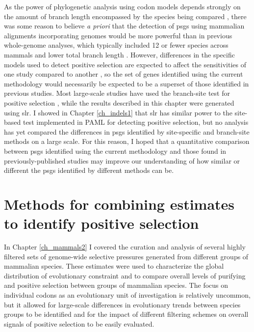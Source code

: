 As the power of phylogenetic analysis using codon models depends
strongly on the amount of branch length encompassed by the species
being compared \citep{Anisimova2001,Anisimova2002}, there was some
reason to believe \emph{a priori} that the detection of \acp{psg}
using mammalian alignments incorporating \lcv genomes would be more
powerful than in previous whole-genome analyses, which typically
included 12 or fewer species across mammals and lower total branch
length \citep{ELLEGREN2008k}. However, differences in the specific
models used to detect positive selection are expected to affect the
sensitivities of one study compared to another \citep{Anisimova2009},
so the set of genes identified using the current methodology would
necessarily be expected to be a superset of those identified in
previous studies. Most large-scale studies have used the branch-site
test for positive selection \citep{Zhang2005}, while the results
described in this chapter were generated using \ac{slr}. I showed in
Chapter \ref{ch_indels1} that \ac{slr} has similar power to the
site-based test implemented in PAML for detecting \sw positive
selection, but no analysis has yet compared the differences in
\acp{psg} identified by site-specific and branch-site methods on a
large scale. For this reason, I hoped that a quantitative comparison
between \acp{psg} identified using the current methodology and those
found in previously-published studies may improve our understanding of
how similar or different the \acp{psg} identified by different methods
can be.

\section{Methods for combining \sw estimates to identify positive selection}

In Chapter \ref{ch_mammals2} I covered the curation and analysis of
several highly filtered sets of genome-wide \sw selective pressures
generated from different groups of mammalian species. These \sw
estimates were used to characterize the global distribution of
evolutionary constraint and to compare overall levels of purifying and
positive selection between groups of mammalian species. The focus on
individual codons as an evolutionary unit of investigation is
relatively uncommon, but it allowed for large-scale differences in
evolutionary trends between species groups to be identified and for
the impact of different filtering schemes on overall signals of
positive selection to be easily evaluated.

